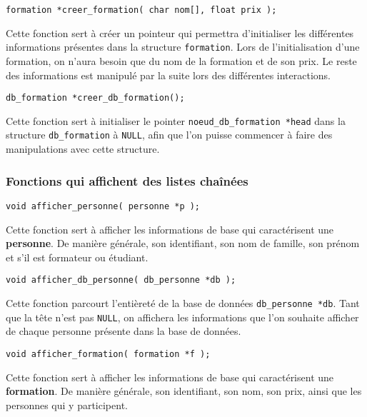 \documentclass[10pt]{article}
\begin{document}
\begin{lstlisting}[firstnumber=303]
  formation *creer_formation( char nom[], float prix );
\end{lstlisting}

Cette fonction sert à créer un pointeur qui permettra d'initialiser les différentes informations présentes dans la structure \texttt{formation}. Lors de l'initialisation d'une formation, on n'aura besoin que du nom de la formation et de son prix. Le reste des informations est manipulé par la suite lors des différentes interactions.

\begin{lstlisting}[firstnumber=442]
  db_formation *creer_db_formation();
\end{lstlisting}

Cette fonction sert à initialiser le pointer \texttt{noeud\_db\_formation *head} dans la structure \texttt{db\_formation} à \texttt{NULL}, afin que l'on puisse commencer à faire des manipulations avec cette structure.

\subsubsection{Fonctions qui affichent des listes chaînées}

\begin{lstlisting}[firstnumber=157]
  void afficher_personne( personne *p );
\end{lstlisting}

Cette fonction sert à afficher les informations de base qui caractérisent une \textbf{personne}. De manière générale, son identifiant, son nom de famille, son prénom et s'il est formateur ou étudiant.

\begin{lstlisting}[firstnumber=257]
  void afficher_db_personne( db_personne *db );
\end{lstlisting}

Cette fonction parcourt l'entièreté de la base de données \texttt{db\_personne *db}. Tant que la tête n'est pas \texttt{NULL}, on affichera les informations que l'on souhaite afficher de chaque personne présente dans la base de données.

\begin{lstlisting}[firstnumber=408]
  void afficher_formation( formation *f );
\end{lstlisting}

Cette fonction sert à afficher les informations de base qui caractérisent une \textbf{formation}. De manière générale, son identifiant, son nom, son prix, ainsi que les personnes qui y participent.
\end{document}
